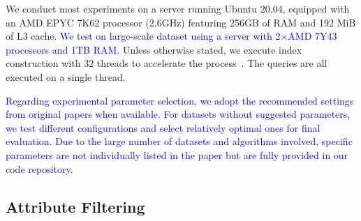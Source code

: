 \documentclass[sigconf, nonacm]{acmart}
\begin{document}
{	
	We conduct most experiments on a server running Ubuntu 20.04, equipped with an AMD EPYC 7K62 processor (2.6GHz) featuring 256GB of RAM and 192 MiB of L3 cache. \textcolor{blue}{ We test on  large-scale dataset using a server with 2×AMD 7Y43 processors and 1TB RAM.}
	Unless otherwise stated, we execute index construction with 32 threads to accelerate the process~\cite{benchmarkindex}. The queries are all executed on a single thread. 
	
	\textcolor{blue}{
	Regarding experimental parameter selection, we adopt the recommended settings from original papers when available. For datasets without suggested parameters, we test different configurations and select relatively optimal ones for final evaluation. Due to the large number of datasets and algorithms involved, specific parameters are not individually listed in the paper but are fully provided in our code repository.
}
	
	
	\subsection{Attribute Filtering}
	
}
\end{document}
